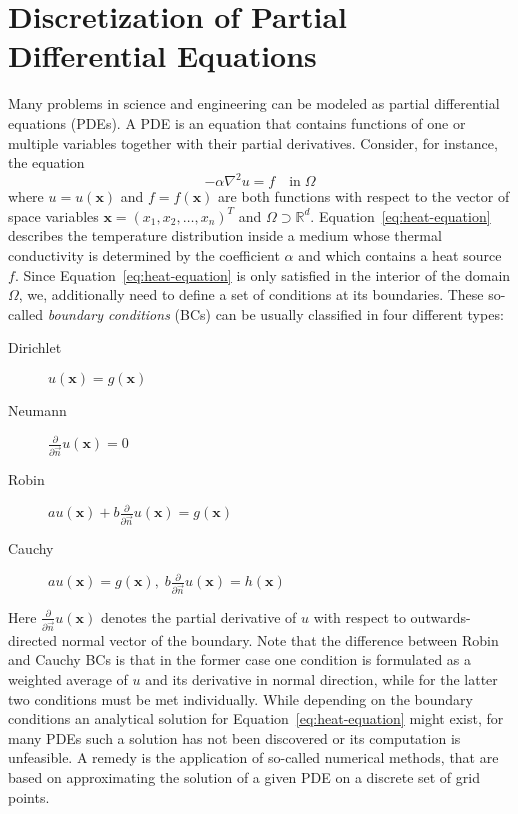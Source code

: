 \section{Discretization of Partial Differential Equations}\label{sec:discretization}
Many problems in science and engineering can be modeled as partial differential equations (PDEs). %
A PDE is an equation that contains functions of one or multiple variables together with their partial derivatives.
Consider, for instance, the equation
\begin{equation}
	-\alpha \nabla^2 u = f \quad \text{in} \; \Omega 
	\label{eq:heat-equation}
\end{equation}
where $u = u(\bm{x})$ and $f = f(\bm{x})$ are both functions with respect to the vector of space variables $\bm{x} = (x_1, x_2, \dots, x_n)^T$ and $\Omega \supset \mathbb{R}^d$.
Equation~\eqref{eq:heat-equation} describes the temperature distribution inside a medium whose thermal conductivity is determined by the coefficient $\alpha$ and which contains a heat source $f$.
Since Equation~\eqref{eq:heat-equation} is only satisfied in the interior of the domain $\Omega$, we, additionally need to define a set of conditions at its boundaries.
These so-called \emph{boundary conditions} (BCs) can be usually classified in four different types:
\begin{description}
	\item[Dirichlet] $u(\bm{x}) = g(\bm{x})$
	\item[Neumann] $\frac{\partial}{\partial \vec{n}} u(\bm{x}) = 0$
	\item[Robin] $a u(\bm{x}) + b \frac{\partial}{\partial \vec{n}} u(\bm{x}) = g(\bm{x})$
	\item[Cauchy] $a u(\bm{x}) = g(\bm{x}), \; b \frac{\partial}{\partial \vec{n}} u(\bm{x}) = h(\bm{x})$
\end{description}
Here $\frac{\partial}{\partial \vec{n}} u(\bm{x})$ denotes the partial derivative of $u$ with respect to outwards-directed normal vector of the boundary.
Note that the difference between Robin and Cauchy BCs is that in the former case one condition is formulated as a weighted average of $u$ and its derivative in normal direction, while for the latter two conditions must be met individually.
While depending on the boundary conditions an analytical solution for Equation~\eqref{eq:heat-equation} might exist, for many PDEs such a solution has not been discovered or its computation is unfeasible.
A remedy is the application of so-called numerical methods, that are based on approximating the solution of a given PDE on a discrete set of grid points. 
